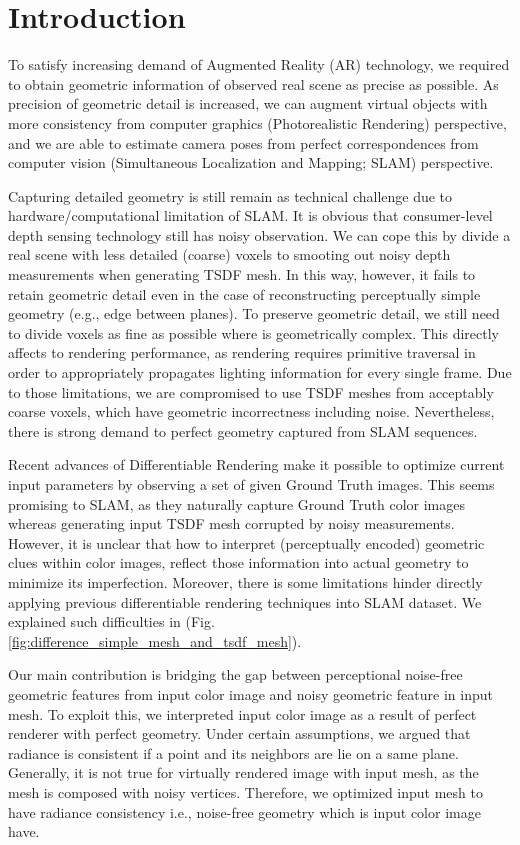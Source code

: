 \section{Introduction}

To satisfy increasing demand of 
Augmented Reality (AR) technology, we required to obtain geometric information of observed real scene as precise as possible. 
As precision of geometric detail is increased, we can augment virtual objects with more consistency from computer graphics (Photorealistic Rendering) perspective, and we are able to estimate camera poses from perfect correspondences from computer vision (Simultaneous Localization and Mapping; SLAM) perspective.

Capturing detailed geometry is still remain as technical challenge due to hardware/computational limitation of SLAM. 
It is obvious that consumer-level depth sensing technology still has noisy observation. 
We can cope this by divide a real scene with less detailed (coarse) voxels to smooting out noisy depth measurements when generating TSDF mesh. 
In this way, however, it fails to retain geometric detail even in the case of reconstructing perceptually simple geometry (e.g., edge between planes).
To preserve geometric detail, we still need to divide voxels as fine as possible where is geometrically complex. 
This directly affects to rendering performance, as rendering requires primitive traversal in order to appropriately propagates lighting information for every single frame. 
Due to those limitations, we are compromised to use TSDF meshes from acceptably coarse voxels, which have geometric incorrectness including noise. 
Nevertheless, there is strong demand to perfect geometry captured from SLAM sequences. 

Recent advances of Differentiable Rendering make it possible to optimize current input parameters by observing a set of given Ground Truth images. 
This seems promising to SLAM, as they naturally capture Ground Truth color images whereas generating input TSDF mesh corrupted by noisy measurements. 
However, it is unclear that how to interpret (perceptually encoded) geometric clues within color images, reflect those information into actual geometry to minimize its imperfection. 
Moreover, there is some limitations hinder directly applying previous differentiable rendering techniques into SLAM dataset. 
We explained such difficulties in (Fig. \ref{fig:difference_simple_mesh_and_tsdf_mesh}).

Our main contribution is bridging the gap between perceptional noise-free geometric features from input color image and noisy geometric feature in input mesh. 
To exploit this, we interpreted input color image as a result of perfect renderer with perfect geometry. 
Under certain assumptions, we argued that radiance is consistent if a point and its neighbors are lie on a same plane.
Generally, it is not true for virtually rendered image with input mesh, as the mesh is composed with noisy vertices.
Therefore, we optimized input mesh to have radiance consistency i.e., noise-free geometry which is input color image have.

